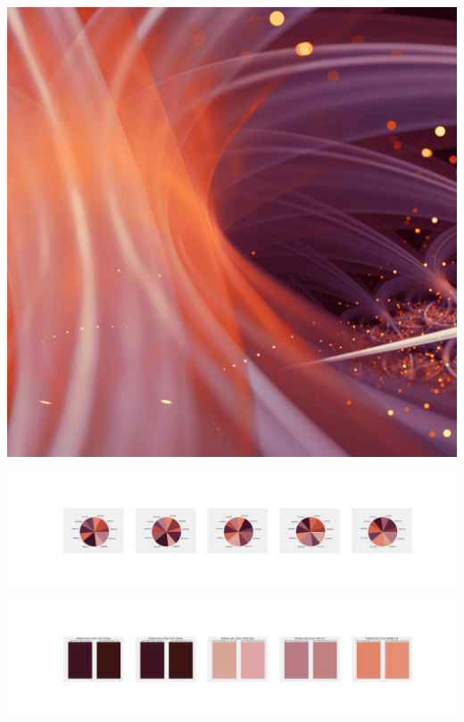 \documentclass[11pt]{article}
\begin{document}
\begin{landscape}
    \begin{center}
    \includegraphics[width=\textwidth]{./nbimg/file (364).jpg}
    \end{center}

    \begin{center}
    \includegraphics[width=250mm]{./nbimg/pie-294.jpg}
    \end{center}

    \begin{center}
    \includegraphics[width=250mm]{./nbimg/peak-294.jpg}
    \end{center}
    


\end{landscape}
\end{document}
